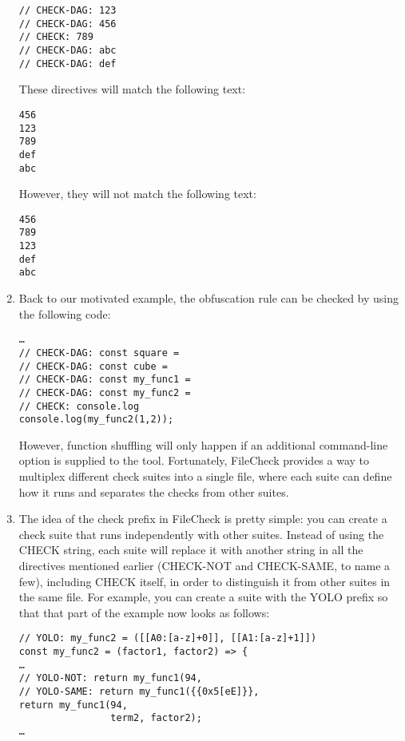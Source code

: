 \begin{enumerate}
\begin{lstlisting}[style=styleJavaScript]
// CHECK-DAG: 123
// CHECK-DAG: 456
// CHECK: 789
// CHECK-DAG: abc
// CHECK-DAG: def
\end{lstlisting}

These directives will match the following text:

\begin{lstlisting}[style=styleJavaScript]
456
123
789
def
abc
\end{lstlisting}

However, they will not match the following text:

\begin{lstlisting}[style=styleJavaScript]
456
789
123
def
abc
\end{lstlisting}

\item Back to our motivated example, the obfuscation rule can be checked by using the following code:

\begin{lstlisting}[style=styleJavaScript]
…
// CHECK-DAG: const square =
// CHECK-DAG: const cube =
// CHECK-DAG: const my_func1 =
// CHECK-DAG: const my_func2 =
// CHECK: console.log
console.log(my_func2(1,2));
\end{lstlisting}

However, function shuffling will only happen if an additional command-line option is supplied to the tool. Fortunately, FileCheck provides a way to multiplex different check suites into a single file, where each suite can define how it runs and separates the checks from other suites.

\item The idea of the check prefix in FileCheck is pretty simple: you can create a check suite that runs independently with other suites. Instead of using the CHECK string, each suite will replace it with another string in all the directives mentioned earlier (CHECK-NOT and CHECK-SAME, to name a few), including CHECK itself, in order to distinguish it from other suites in the same file. For example, you can create a suite with the YOLO prefix so that that part of the example now looks as follows:

\begin{lstlisting}[style=styleJavaScript]
// YOLO: my_func2 = ([[A0:[a-z]+0]], [[A1:[a-z]+1]])
const my_func2 = (factor1, factor2) => {
…
// YOLO-NOT: return my_func1(94,
// YOLO-SAME: return my_func1({{0x5[eE]}},
return my_func1(94,
				term2, factor2);
…
\end{lstlisting}


\end{enumerate}
